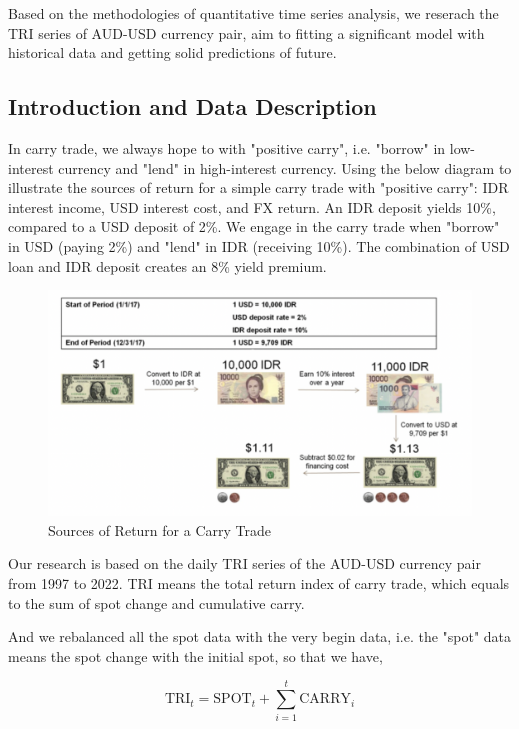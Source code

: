 \documentclass[runningheads]{llncs}
\begin{document}
Based on the methodologies of quantitative time series analysis, we reserach the TRI series of AUD-USD currency pair, aim to fitting a significant model with historical data and getting solid predictions of future.

\subsection{Introduction and Data Description}

In carry trade, we always hope to with "positive carry", i.e. "borrow" in low-interest currency and "lend" in high-interest currency.
Using the below diagram to illustrate the sources of return for a simple carry trade with "positive carry": IDR interest income, USD interest cost, and FX return.
An IDR deposit yields 10\%, compared to a USD deposit of 2\%. We engage in the carry trade when "borrow" in USD (paying 2\%) and "lend" in IDR (receiving 10\%). The combination of USD loan and IDR deposit creates an 8\% yield premium.

\begin{figure}[htbp]
    \centering
    \includegraphics[width=\textwidth]{../img/carry.png}
    \caption{Sources of Return for a Carry Trade}
    \label{fig:1}
\end{figure}

Our research is based on the daily TRI series of the AUD-USD currency pair from 1997 to 2022. TRI means the total return index of carry trade, which equals to the sum of spot change and cumulative carry.

And we rebalanced all the spot data with the very begin data, i.e. the "spot" data means the spot change with the initial spot, so that we have,

$$
    \mbox{TRI}_{t} = \mbox{SPOT}_{t} + \sum_{i=1}^{t} \mbox{CARRY}_{i}
$$
\end{document}
